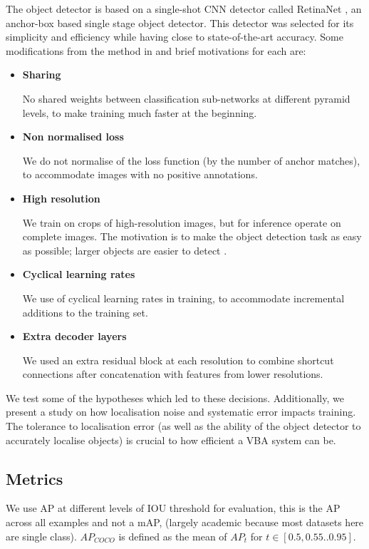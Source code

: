 \documentclass[conference]{IEEEtran}
\begin{document}
The object detector is based on a single-shot \gls{CNN} detector called RetinaNet \cite{Lin2017}, an anchor-box based single stage object detector. This detector was selected for its simplicity and efficiency while having close to state-of-the-art accuracy. Some modifications from the method in \cite{Lin2017} and brief motivations for each are:

\begin{itemize}
    \item {\textbf {Sharing}}\par No shared weights between classification sub-networks at different pyramid levels, to make training much faster at the beginning.
    \item {\textbf {Non normalised loss}}\par 
    We do not normalise of the loss function (by the number of anchor matches), to accommodate images with no positive annotations.
    \item {\textbf {High resolution}}\par We train on crops of high-resolution images, but for inference operate on complete images. The motivation is to make the object detection task as easy as possible; larger objects are easier to detect \cite{Lin2014}. 
    \item {\textbf {Cyclical learning rates}}\par We use of cyclical learning rates in training, to accommodate incremental additions to the training set.
    \item {\textbf{Extra decoder layers}}\par We used an extra residual block at each resolution to combine shortcut connections after concatenation with features from lower resolutions.
\end{itemize}

We test some of the hypotheses which led to these decisions. Additionally, we present a study on how localisation noise and systematic error impacts training. The tolerance to localisation error (as well as the ability of the object detector to accurately localise objects) is crucial to how efficient a \gls{VBA} system can be.

\subsection{Metrics}

We use \gls{AP} at different levels of \gls{IOU} threshold for evaluation, this is the \gls{AP} across all examples and not a \gls{mAP}, (largely academic because most datasets here are single class). $AP_{COCO}$ is defined as the mean of $AP_t$ for $t \in [0.5, 0.55..0.95]$.
\end{document}
